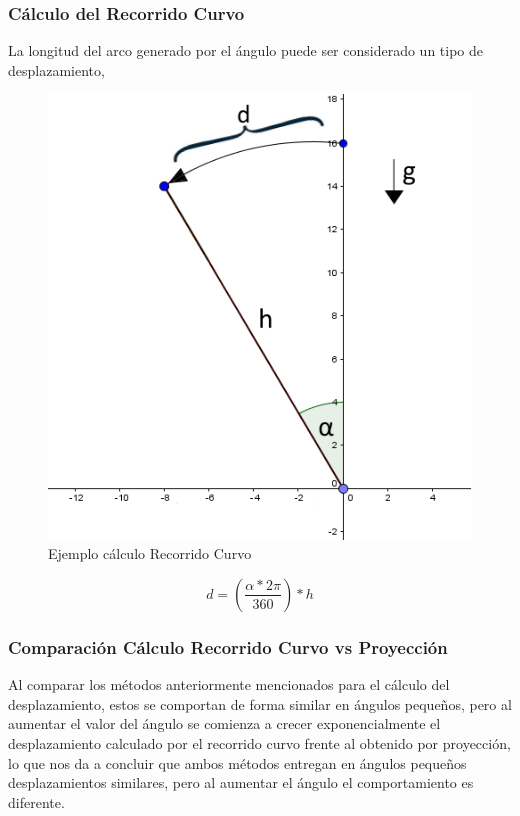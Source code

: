 \documentclass[12pt,a4paper]{article}
\begin{document}
\subsubsection{Cálculo del Recorrido Curvo}
La longitud del arco generado por el ángulo puede ser considerado un tipo de desplazamiento, 
\begin{figure}[H]
	\centering
	\includegraphics[scale=0.5]{images/calculoRecorridoCurvo}
	\caption{Ejemplo cálculo Recorrido Curvo}
	\label{fig:recorridocurvo}
\end{figure}

\begin{equation}
	\label{eq:recorridocurvo}
	d=\left(\frac{\alpha*2\pi}{360}\right)*h
\end{equation}


\subsubsection{Comparación Cálculo Recorrido Curvo vs Proyección}
Al comparar los métodos anteriormente mencionados para el cálculo del desplazamiento, estos se comportan de forma similar en ángulos pequeños, pero al aumentar el valor del ángulo se comienza a crecer exponencialmente el desplazamiento calculado por el recorrido curvo frente al obtenido por proyección, lo que nos da a concluir que ambos métodos entregan en ángulos pequeños desplazamientos similares, pero al aumentar el ángulo el comportamiento es diferente.
\end{document}
